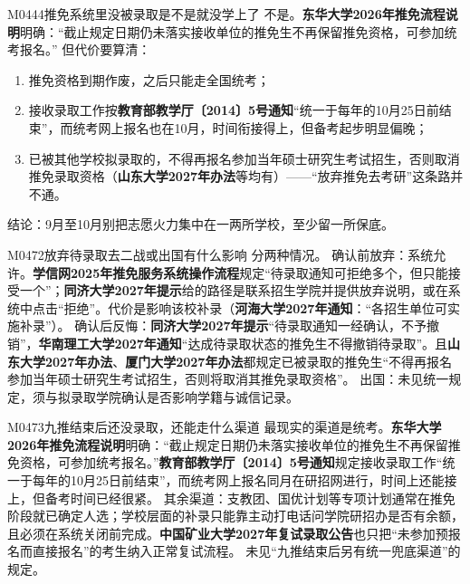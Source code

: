 \begin{qa}{M0444}{推免系统里没被录取是不是就没学上了}
不是。\textbf{东华大学2026年推免流程说明}明确：“截止规定日期仍未落实接收单位的推免生不再保留推免资格，可参加统考报名。”
但代价要算清：
\begin{enumerate}
  \item 推免资格到期作废，之后只能走全国统考；
  \item 接收录取工作按\textbf{教育部教学厅〔2014〕5号通知}“统一于每年的10月25日前结束”，而统考网上报名也在10月，时间衔接得上，但备考起步明显偏晚；
  \item 已被其他学校拟录取的，不得再报名参加当年硕士研究生考试招生，否则取消推免录取资格（\textbf{山东大学2027年办法}等均有）——“放弃推免去考研”这条路并不通。
\end{enumerate}
结论：9月至10月别把志愿火力集中在一两所学校，至少留一所保底。
\end{qa}

\begin{qa}{M0472}{放弃待录取去二战或出国有什么影响}
分两种情况。
确认前放弃：系统允许。\textbf{学信网2025年推免服务系统操作流程}规定“待录取通知可拒绝多个，但只能接受一个”；\textbf{同济大学2027年提示}给的路径是联系招生学院并提供放弃说明，或在系统中点击“拒绝”。代价是影响该校补录（\textbf{河海大学2027年通知}：“各招生单位可实施补录”）。
确认后反悔：\textbf{同济大学2027年提示}“待录取通知一经确认，不予撤销”，\textbf{华南理工大学2027年通知}“达成待录取状态的推免生不得撤销待录取”。且\textbf{山东大学2027年办法}、\textbf{厦门大学2027年办法}都规定已被录取的推免生“不得再报名参加当年硕士研究生考试招生，否则将取消其推免录取资格”。
出国：未见统一规定，须与拟录取学院确认是否影响学籍与诚信记录。
\end{qa}

\begin{qa}{M0473}{九推结束后还没录取，还能走什么渠道}
最现实的渠道是统考。\textbf{东华大学2026年推免流程说明}明确：“截止规定日期仍未落实接收单位的推免生不再保留推免资格，可参加统考报名。”\textbf{教育部教学厅〔2014〕5号通知}规定接收录取工作“统一于每年的10月25日前结束”，而统考网上报名同月在研招网进行，时间上还能接上，但备考时间已经很紧。
其余渠道：支教团、国优计划等专项计划通常在推免阶段就已确定人选；学校层面的补录只能靠主动打电话问学院研招办是否有余额，且必须在系统关闭前完成。\textbf{中国矿业大学2027年复试录取公告}也只把“未参加预报名而直接报名”的考生纳入正常复试流程。
未见“九推结束后另有统一兜底渠道”的规定。
\end{qa}

